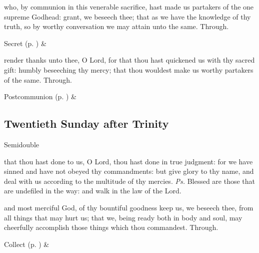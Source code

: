
\secret
{} who, by communion in this venerable sacrifice, hast made us partakers of the one supreme Godhead: grant, we beseech thee; that as we have the knowledge of thy truth, so by worthy conversation we may attain unto the same. Through.
\begin{rubric}
     Secret  (p. \pageref{SPSaints}) \&  
\end{rubric}


\postcommunion
{} render thanks unto thee, O Lord, for that thou hast quickened us with thy sacred gift: humbly beseeching thy mercy; that thou wouldest make us worthy partakers of the same. Through.
\begin{rubric}
     Postcommunion  (p. \pageref{SPSaints}) \&  
\end{rubric}


\clearpage
\subsection{Twentieth Sunday after Trinity}
\begin{inhead}
{Semidouble}
\end{inhead}


\introit
{} that thou hast done to us, O Lord, thou hast done in true judgment: for we have sinned and have not obeyed thy commandments: but give glory to thy name, and deal with us according to the multitude of thy mercies. \textit{Ps.} Blessed are those that are undefiled in the way: and walk in the law of the Lord.

\collect
{} and most merciful God, of thy bountiful goodness keep us, we beseech thee, from all things that may hurt us; that we, being ready both in body and soul, may cheerfully accomplish those things which thou commandest. Through.
\begin{rubric}
     Collect  (p. \pageref{SPSaints}) \&  
\end{rubric}

